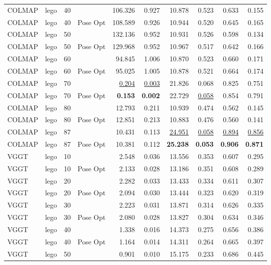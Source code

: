 \begin{table}[H]
\begin{tabular}{llrlrrrrrr}
COLMAP & lego & 40 &  & 106.326 & 0.927 & 10.878 & 0.523 & 0.633 & 0.155 \\
COLMAP & lego & 40 & Pose Opt & 108.589 & 0.926 & 10.944 & 0.520 & 0.645 & 0.165 \\
COLMAP & lego & 50 &  & 132.136 & 0.952 & 10.931 & 0.526 & 0.598 & 0.134 \\
COLMAP & lego & 50 & Pose Opt & 129.968 & 0.952 & 10.967 & 0.517 & 0.642 & 0.166 \\
COLMAP & lego & 60 &  & 94.845 & 1.006 & 10.870 & 0.523 & 0.660 & 0.171 \\
COLMAP & lego & 60 & Pose Opt & 95.025 & 1.005 & 10.878 & 0.521 & 0.664 & 0.174 \\
COLMAP & lego & 70 &  & \underline{0.204} & \underline{0.003} & 21.826 & 0.068 & 0.825 & 0.751 \\
COLMAP & lego & 70 & Pose Opt & \textbf{0.153} & \textbf{0.002} & 22.729 & \underline{0.058} & 0.854 & 0.791 \\
COLMAP & lego & 80 &  & 12.793 & 0.211 & 10.939 & 0.474 & 0.562 & 0.145 \\
COLMAP & lego & 80 & Pose Opt & 12.851 & 0.213 & 10.883 & 0.476 & 0.560 & 0.141 \\
COLMAP & lego & 87 &  & 10.431 & 0.113 & \underline{24.951} & \underline{0.058} & \underline{0.894} & \underline{0.856} \\
COLMAP & lego & 87 & Pose Opt & 10.381 & 0.112 & \textbf{25.238} & \textbf{0.053} & \textbf{0.906} & \textbf{0.871} \\
VGGT & lego & 10 &  & 2.548 & 0.036 & 13.556 & 0.353 & 0.607 & 0.295 \\
VGGT & lego & 10 & Pose Opt & 2.133 & 0.028 & 13.186 & 0.351 & 0.608 & 0.289 \\
VGGT & lego & 20 &  & 2.282 & 0.033 & 13.433 & 0.334 & 0.611 & 0.307 \\
VGGT & lego & 20 & Pose Opt & 2.094 & 0.030 & 13.444 & 0.323 & 0.620 & 0.319 \\
VGGT & lego & 30 &  & 2.223 & 0.031 & 13.871 & 0.314 & 0.626 & 0.335 \\
VGGT & lego & 30 & Pose Opt & 2.080 & 0.028 & 13.827 & 0.304 & 0.634 & 0.346 \\
VGGT & lego & 40 &  & 1.338 & 0.016 & 14.373 & 0.275 & 0.656 & 0.386 \\
VGGT & lego & 40 & Pose Opt & 1.164 & 0.014 & 14.311 & 0.264 & 0.665 & 0.397 \\
VGGT & lego & 50 &  & 0.901 & 0.010 & 15.175 & 0.233 & 0.686 & 0.445 \\

\end{tabular}
\end{table}

